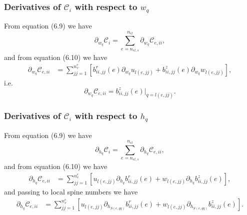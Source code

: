 \documentclass{article}
\begin{document}
\subsubsection{Derivatives of $\mathcal{C}_i$ with respect to $w_q$} %
From equation (6.9) we have
\begin{equation}
\partial_{w_q} \mathcal{C}_i = \sum_{e=n_{el,s}}^{n_{el}} \partial_{w_q} \mathcal{C}_{e,ii}, \tag{6.14}
\end{equation}
and from equation (6.10) we have
\begin{align}
\partial_{w_q} \mathcal{C}_{e,ii} &= \sum_{jj=1}^{n_v^e} \left[ b_{ii,jj}^r(e) \partial_{w_q} u_{l(e,jj)} + b_{ii,jj}^z(e) \partial_{w_q} w_{l(e,jj)} \right], \tag{6.15}
\end{align}
i.e.
\begin{equation}
\partial_{w_q} \mathcal{C}_{e,ii} = b_{ii,jj}^z(e) \big|_{q=l(e,jj)}. \tag{6.16}
\end{equation}

\subsubsection{Derivatives of $\mathcal{C}_i$ with respect to $h_q$} %
From equation (6.9) we have
\begin{equation}
\partial_{h_q} \mathcal{C}_i = \sum_{e=n_{el,s}}^{n_{el}} \partial_{h_q} \mathcal{C}_{e,ii}, \tag{6.17}
\end{equation}
and from equation (6.10) we have
\begin{align}
\partial_{h_q} \mathcal{C}_{e,ii} &= \sum_{jj=1}^{n_v^e} \left[ u_{l(e,jj)} \partial_{h_q} b_{ii,jj}^r(e) + w_{l(e,jj)} \partial_{h_q} b_{ii,jj}^z(e) \right], \tag{6.18}
\end{align}
and passing to local spine numbers we have
\begin{align}
\partial_{h_q} \mathcal{C}_{e,ii} &= \sum_{jj=1}^{n_v^e} \left[ u_{l(e,jj)} \partial_{h_{S(e,qq)}} b_{ii,jj}^r(e) + w_{l(e,jj)} \partial_{h_{S(e,qq)}} b_{ii,jj}^z(e) \right]. \tag{6.19}
\end{align}
\end{document}
